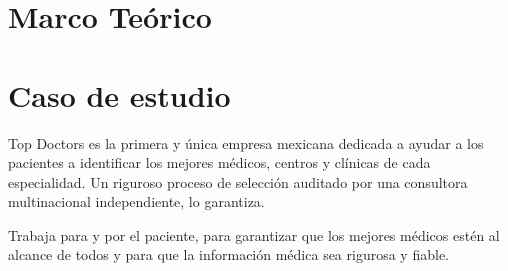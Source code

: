 \documentclass[12pt,letter]{report}
\begin{document}
\tableofcontents
\listoffigures
\listoftables

\chapter{Marco Teórico}




\chapter{Caso de estudio}
Top Doctors es la primera y única empresa mexicana dedicada a ayudar a los pacientes a identificar los mejores médicos, centros y clínicas de cada especialidad. Un riguroso proceso de selección auditado por una consultora multinacional independiente, lo garantiza.

Trabaja para y por el paciente, para garantizar que los mejores médicos estén al alcance de todos y para que la información médica sea rigurosa y fiable. 




\nocite{*} %


\end{document}
